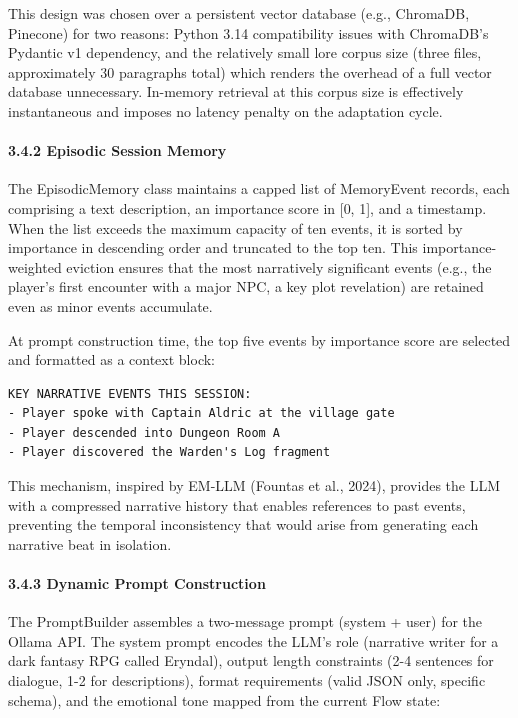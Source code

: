 This design was chosen over a persistent vector database (e.g.,
ChromaDB, Pinecone) for two reasons: Python 3.14 compatibility issues
with ChromaDB's Pydantic v1 dependency, and the relatively small lore
corpus size (three files, approximately 30 paragraphs total) which
renders the overhead of a full vector database unnecessary. In-memory
retrieval at this corpus size is effectively instantaneous and imposes
no latency penalty on the adaptation cycle.

\paragraph{3.4.2 Episodic Session Memory}\label{episodic-session-memory}

The EpisodicMemory class maintains a capped list of MemoryEvent records,
each comprising a text description, an importance score in {[}0, 1{]},
and a timestamp. When the list exceeds the maximum capacity of ten
events, it is sorted by importance in descending order and truncated to
the top ten. This importance-weighted eviction ensures that the most
narratively significant events (e.g., the player's first encounter with
a major NPC, a key plot revelation) are retained even as minor events
accumulate.

At prompt construction time, the top five events by importance score are
selected and formatted as a context block:

\begin{verbatim}
KEY NARRATIVE EVENTS THIS SESSION:
- Player spoke with Captain Aldric at the village gate
- Player descended into Dungeon Room A
- Player discovered the Warden's Log fragment
\end{verbatim}

This mechanism, inspired by EM-LLM (Fountas et al., 2024), provides the
LLM with a compressed narrative history that enables references to past
events, preventing the temporal inconsistency that would arise from
generating each narrative beat in isolation.

\paragraph{3.4.3 Dynamic Prompt
Construction}\label{dynamic-prompt-construction}

The PromptBuilder assembles a two-message prompt (system + user) for the
Ollama API. The system prompt encodes the LLM's role (narrative writer
for a dark fantasy RPG called Eryndal), output length constraints (2-4
sentences for dialogue, 1-2 for descriptions), format requirements
(valid JSON only, specific schema), and the emotional tone mapped from
the current Flow state:

